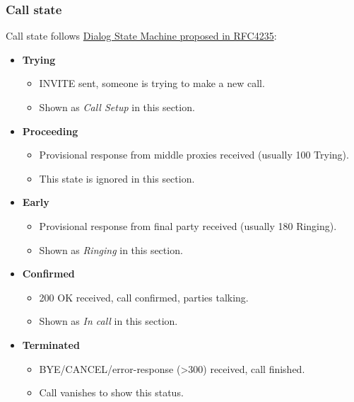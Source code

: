 \documentclass[letterpaper,10pt,spanish]{sphinxmanual}
\begin{document}
\subsubsection{Call state}
\label{administration_portal/brand/calls/active_calls:call-state}
Call state follows \href{https://tools.ietf.org/html/rfc4235\#section-3.7.1}{Dialog State Machine proposed in RFC4235}:
\begin{itemize}
\item {} 
\textbf{Trying}
\begin{itemize}
\item {} 
INVITE sent, someone is trying to make a new call.

\item {} 
Shown as \emph{Call Setup} in this section.

\end{itemize}

\item {} 
\textbf{Proceeding}
\begin{itemize}
\item {} 
Provisional response from middle proxies received (usually 100 Trying).

\item {} 
This state is ignored in this section.

\end{itemize}

\item {} 
\textbf{Early}
\begin{itemize}
\item {} 
Provisional response from final party received (usually 180 Ringing).

\item {} 
Shown as \emph{Ringing} in this section.

\end{itemize}

\item {} 
\textbf{Confirmed}
\begin{itemize}
\item {} 
200 OK received, call confirmed, parties talking.

\item {} 
Shown as \emph{In call} in this section.

\end{itemize}

\item {} 
\textbf{Terminated}
\begin{itemize}
\item {} 
BYE/CANCEL/error-response (\textgreater{}300) received, call finished.

\item {} 
Call vanishes to show this status.

\end{itemize}

\end{itemize}
\end{document}
